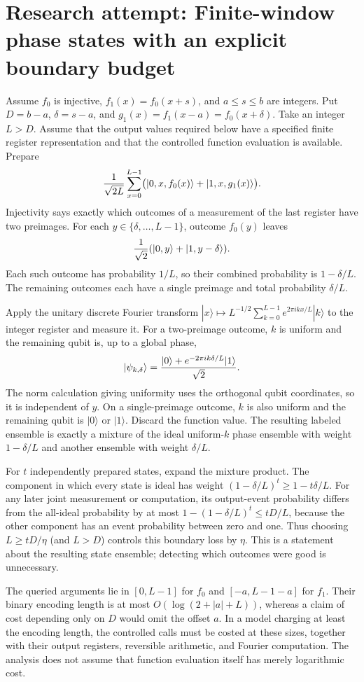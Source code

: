 \documentclass[11pt]{article}
\begin{document}
\section{Research attempt: Finite-window phase states with an explicit boundary budget}
Assume $f_0$ is injective, $f_1(x)=f_0(x+s)$, and $a\leq s\leq b$ are integers. Put $D=b-a$, $\delta=s-a$, and $g_1(x)=f_1(x-a)=f_0(x+\delta)$. Take an integer $L>D$. Assume that the output values required below have a specified finite register representation and that the controlled function evaluation is available. Prepare
\[
 {1\over\sqrt{2L}}\sum_{x=0}^{L-1}
 \bigl(|0,x,f_0(x)\rangle+|1,x,g_1(x)\rangle\bigr).
\]
Injectivity says exactly which outcomes of a measurement of the last register have two preimages. For each $y\in\{\delta,\ldots,L-1\}$, outcome $f_0(y)$ leaves
\[
 {1\over\sqrt2}(|0,y\rangle+|1,y-\delta\rangle).
\]
Each such outcome has probability $1/L$, so their combined probability is $1-\delta/L$. The remaining outcomes each have a single preimage and total probability $\delta/L$.

Apply the unitary discrete Fourier transform $|x\rangle\mapsto L^{-1/2}\sum_{k=0}^{L-1}e^{2\pi i kx/L}|k\rangle$ to the integer register and measure it. For a two-preimage outcome, $k$ is uniform and the remaining qubit is, up to a global phase,
\[
 |\psi_{k,\delta}\rangle={|0\rangle+e^{-2\pi i k\delta/L}|1\rangle\over\sqrt2}.
\]
The norm calculation giving uniformity uses the orthogonal qubit coordinates, so it is independent of $y$. On a single-preimage outcome, $k$ is also uniform and the remaining qubit is $|0\rangle$ or $|1\rangle$. Discard the function value. The resulting labeled ensemble is exactly a mixture of the ideal uniform-$k$ phase ensemble with weight $1-\delta/L$ and another ensemble with weight $\delta/L$.

For $t$ independently prepared states, expand the mixture product. The component in which every state is ideal has weight $(1-\delta/L)^t\geq1-t\delta/L$. For any later joint measurement or computation, its output-event probability differs from the all-ideal probability by at most $1-(1-\delta/L)^t\leq tD/L$, because the other component has an event probability between zero and one. Thus choosing $L\geq tD/\eta$ (and $L>D$) controls this boundary loss by $\eta$. This is a statement about the resulting state ensemble; detecting which outcomes were good is unnecessary.

The queried arguments lie in $[0,L-1]$ for $f_0$ and $[-a,L-1-a]$ for $f_1$. Their binary encoding length is at most $O(\log(2+|a|+L))$, whereas a claim of cost depending only on $D$ would omit the offset $a$. In a model charging at least the encoding length, the controlled calls must be costed at these sizes, together with their output registers, reversible arithmetic, and Fourier computation. The analysis does not assume that function evaluation itself has merely logarithmic cost.
\end{document}

